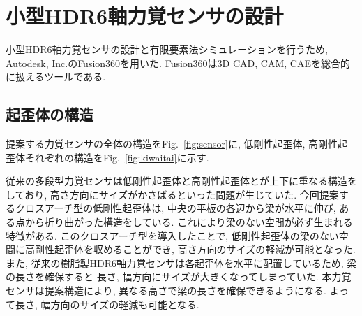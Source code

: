 \section{小型HDR6軸力覚センサの設計}
小型HDR6軸力覚センサの設計と有限要素法シミュレーションを行うため, 
Autodesk, Inc.のFusion360を用いた. Fusion360は3D CAD, CAM, CAEを総合的に扱えるツールである. 

\subsection{起歪体の構造}
提案する力覚センサの全体の構造をFig.~\ref{fig:sensor}に,
低剛性起歪体, 高剛性起歪体それぞれの構造をFig.~\ref{fig:kiwaitai}に示す. 

従来の多段型力覚センサは低剛性起歪体と高剛性起歪体とが上下に重なる構造をしており, 
高さ方向にサイズがかさばるといった問題が生じていた. 
今回提案するクロスアーチ型の低剛性起歪体は, 中央の平板の各辺から梁が水平に伸び, 
ある点から折り曲がった構造をしている. 
これにより梁のない空間が必ず生まれる特徴がある. 
このクロスアーチ型を導入したことで, 低剛性起歪体の梁のない空間に高剛性起歪体を収めることができ, 
高さ方向のサイズの軽減が可能となった. 
また, 従来の樹脂製HDR6軸力覚センサは各起歪体を水平に配置しているため, 梁の長さを確保すると
長さ, 幅方向にサイズが大きくなってしまっていた. 本力覚センサは提案構造により, 
異なる高さで梁の長さを確保できるようになる. よって長さ, 幅方向のサイズの軽減も可能となる.

